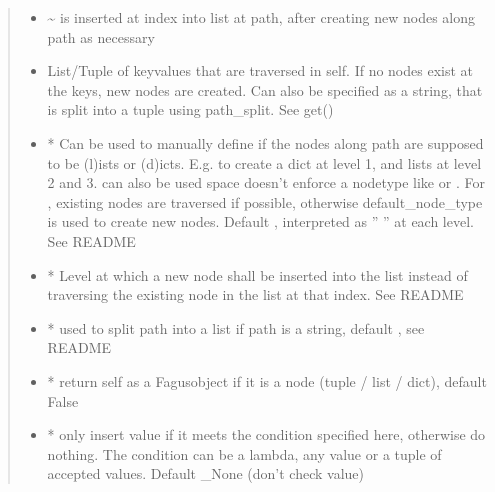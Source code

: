 \documentclass[a4paper,10pt,english]{sphinxmanual}
\begin{document}
\begin{fulllineitems}
\begin{fulllineitems}
\begin{quote}
\begin{description}
\begin{itemize}
\item {}
\sphinxAtStartPar
{} \textendash{} \textasciitilde{} is inserted at index into list at path, after creating new nodes along path as necessary

\item {}
\sphinxAtStartPar
{} \textendash{} List/Tuple of key\sphinxhyphen{}values that are traversed in self. If no nodes exist at the keys, new nodes are
created. Can also be specified as a string, that is split into a tuple using path\_split. See get()

\item {}
\sphinxAtStartPar
{} \textendash{} * Can be used to manually define if the nodes along path are supposed to be (l)ists or
(d)icts. E.g.  to create a dict at level 1, and lists at level 2 and 3.  can also be
used \textendash{} space doesn’t enforce a node\sphinxhyphen{}type like  or . For , existing nodes are
traversed if possible, otherwise default\_node\_type is used to create new nodes. Default ,
interpreted as ” ” at each level. See README

\item {}
\sphinxAtStartPar
{} \textendash{} * Level at which a new node shall be inserted into the list instead of traversing the
existing node in the list at that index. See README

\item {}
\sphinxAtStartPar
{} \textendash{} * used to split path into a list if path is a string, default , see README

\item {}
\sphinxAtStartPar
{} \textendash{} * return self as a Fagus\sphinxhyphen{}object if it is a node (tuple / list / dict), default False

\item {}
\sphinxAtStartPar
{} \textendash{} * only insert value if it meets the condition specified here, otherwise do nothing. The condition
can be a lambda, any value or a tuple of accepted values. Default \_None (don’t check value)


\end{itemize}
\end{description}
\end{quote}
\end{fulllineitems}
\end{fulllineitems}
\end{document}
